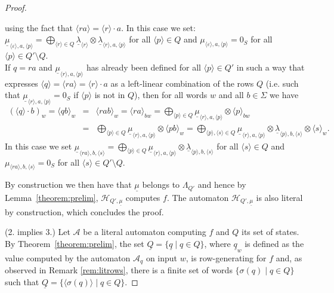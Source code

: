 \documentclass{lmcs}
\numberwithin{theorem}{section}
\begin{document}
\begin{proof}
\begin{itemize}
using the fact that $\langle r a \rangle = \langle r \rangle \cdot a$. In this case we set: $\underline{\mu}_{\langle \varepsilon \rangle,a,\langle p \rangle} = \bigoplus_{\langle r \rangle \in Q} \underline{\lambda}_{\langle r \rangle} \otimes \underline{\lambda}_{\langle{r} \rangle,a,\langle p\rangle}$ for all $\langle p \rangle \in Q$ and $\mu_{\langle \varepsilon \rangle ,a, \langle p \rangle } = 0_S$ for all $\langle p \rangle \in Q' \setminus Q$.\\
        If $q = ra$ and $\underline{\mu}_{\langle r \rangle ,a,\langle p \rangle}$ has already been defined for all $\langle p \rangle \in Q'$ in such a way that expresses $\langle q \rangle = \langle ra \rangle = \langle r \rangle \cdot a$ as a left-linear combination of the rows $Q$ (i.e. such that $\underline{\mu}_{\langle r \rangle,a,\langle p \rangle}=0_S$ if $\langle p \rangle$ is not in $Q$), then for all words $w$ and all $ b\in \Sigma$ we have 
		\begin{eqnarray*}(\langle q \rangle \cdot b)_w = \langle qb \rangle_w &=& \langle rab \rangle_w = \langle ra \rangle_{bw} =  \bigoplus_{\langle p  \rangle \in Q} \underline{\mu}_{\langle r \rangle ,a,\langle p\rangle}\otimes \langle p \rangle_{bw}\\
			&=& \bigoplus_{\langle p  \rangle \in Q} \underline{\mu}_{\langle r \rangle ,a,\langle p\rangle} \otimes \langle pb \rangle_{w} = \bigoplus_{\langle p \rangle,\langle s \rangle \in Q} \underline{\mu}_{\langle r \rangle ,a,\langle p\rangle} \otimes \underline{\lambda}_{\langle p \rangle ,b, \langle s\rangle} \otimes \langle s \rangle_{w}.\end{eqnarray*}
		In this case we set $\underline{\mu}_{\langle ra \rangle ,b,\langle s\rangle} = \bigoplus_{\langle p \rangle \in Q} \underline{\mu}_{\langle r \rangle,a,\langle p\rangle} \otimes \underline{\lambda}_{\langle p\rangle ,b,\langle s\rangle }$ for all $\langle s \rangle \in Q$ and $\mu_{\langle ra \rangle ,b,\langle s\rangle} = 0_S$ for all $\langle s \rangle \in Q' \setminus Q$.
	\end{itemize}
By construction we then have that $\underline{\mu}$ belongs to $\Lambda_{Q'}$ and hence by Lemma~\ref{theorem:prelim}, $\mathcal{H}_{Q',\underline{\mu}}$ computes $f$. The automaton $\mathcal{H}_{Q',\underline{\mu}}$ is also literal by construction, which concludes the proof.
	
(2. implies 3.) Let $\mathcal{A}$ be a literal automaton computing $f$ and $Q$ its set of states. By Theorem~\ref{theorem:prelim}, the set $\underline{Q}=\{\underline{q}  \mid q \in Q\}$, where $\underline{q}_w$ is defined as the value computed by the automaton $\mathcal{A}_q$ on input $w$, is row-generating for $f$ and, as observed in Remark \ref{rem:litrows}, there is a finite set of words $\{\sigma(q) \mid q \in Q\}$ such that $\underline{Q} = \{\langle\sigma(q) \rangle \mid q \in Q\}$. 
	

\end{proof}
\end{document}
